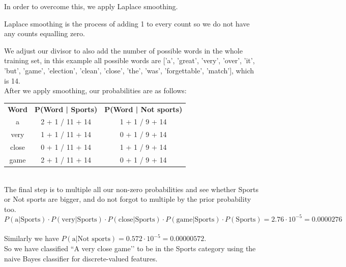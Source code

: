 \documentclass[11pt,fleqn]{book} %
\begin{document}
\noindent
In order to overcome this, we apply Laplace smoothing. \\
\begin{definition}
	Laplace smoothing is the process of adding 1 to every count so we do not have any counts equalling zero.
\end{definition}

\noindent
We adjust our divisor to also add the number of possible words in the whole training set, in this example all possible words are ['a', 'great', 'very', 'over', 'it', 'but', 'game', 'election', 'clean', 'close', 'the', 'was', 'forgettable', 'match'], which is 14. \\

\noindent
After we apply smoothing, our probabilities are as follows:
\begin{table}[h]
	\centering
	\begin{tabular}{ccc}
		\textbf{Word} & \textbf{P(Word | Sports)} & \textbf{P(Word | Not sports)} \\
		a             & 2 + 1 / 11 + 14           & 1 + 1 / 9 + 14                \\
		very          & 1 + 1 / 11 + 14           & 0 + 1 / 9 + 14                \\
		close         & 0 + 1 / 11 + 14           & 1 + 1 / 9 + 14                \\
		game          & 2 + 1 / 11 + 14           & 0 + 1 / 9 + 14               
	\end{tabular}
\end{table}
\ \\
\noindent
The final step is to multiple all our non-zero probabilities and see whether Sports or Not sports are bigger, and do not forgot to multiple by the prior probability too. \\
\begin{equation*}
P(\text{a} \vert \text{Sports}) \cdot P(\text{very} \vert \text{Sports}) \cdot P(\text{close} \vert \text{Sports}) \cdot P(\text{game} \vert \text{Sports}) \cdot P(\text{Sports}) = 2.76 \cdot 10^{-5} = 0.0000276
\end{equation*}
\ \\
\noindent
Similarly we have $P(\text{a} \vert \text{Not sports}) = 0.572 \cdot 10^{-5} = 0.00000572$. \\

\noindent
So we have classified ``A very close game’’ to be in the Sports category using the naive Bayes classifier for discrete-valued features.\\
\end{document}
